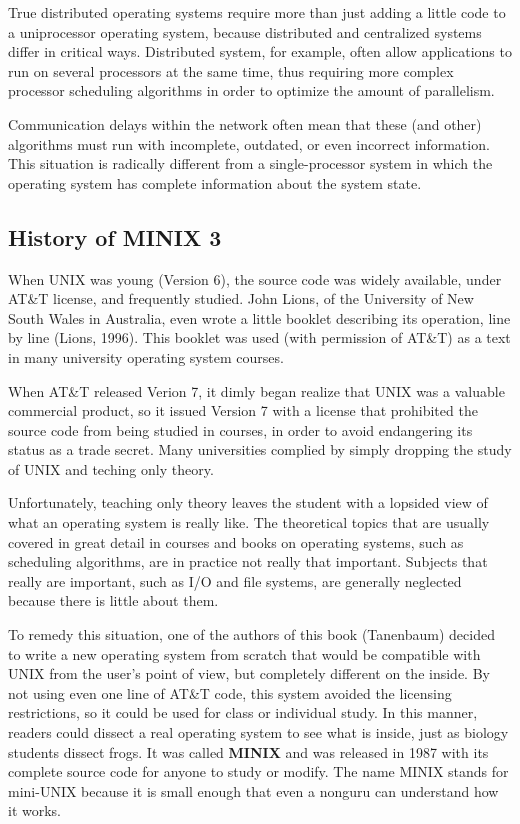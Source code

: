 \documentclass{book}
\newcommand {\kw}  [1] {\textbf{#1}}
\begin{document}
True distributed operating systems require more than just adding a little code to a uniprocessor operating system, 
because distributed and centralized systems differ in critical ways.
Distributed system, for example, often allow applications to run on several processors at the same time, 
thus requiring more complex processor scheduling algorithms in order to optimize the amount of parallelism.

Communication delays within the network often mean that these (and other) algorithms must run with incomplete, outdated, or even incorrect information.
This situation is radically different from a single-processor system in which the operating system has complete information about the system state.


\subsection{History of MINIX 3}
When UNIX was young (Version 6), the source code was widely available, under AT\&T license, and frequently studied.
John Lions, of the University of New South Wales in Australia, even wrote a little booklet describing its operation, line by line (Lions, 1996).
This booklet was used (with permission of AT\&T) as a text in many university operating system courses.

When AT\&T released Verion 7, it dimly began realize that UNIX was a valuable commercial product, 
so it issued Version 7 with a license that prohibited the source code from being studied in courses, 
in order to avoid endangering its status as a trade secret. 
Many universities complied by simply dropping the study of UNIX and teching only theory.

Unfortunately, teaching only theory leaves the student with a lopsided view of what an operating system is really like.
The theoretical topics that are usually covered in great detail in courses and books on operating systems, 
such as scheduling algorithms, are in practice not really that important. 
Subjects that really are important, such as I/O and file systems, are generally neglected because there is little about them.

To remedy this situation, one of the authors of this book (Tanenbaum) decided to write a new operating system from scratch 
that would be compatible with UNIX from the user's point of view,  but completely different on the inside.
By not using even one line of AT\&T code, this system avoided the licensing restrictions, so it could be used for class or individual study.
In this manner, readers could dissect a real operating system to see what is inside, just as biology students dissect frogs.
It was called \kw{MINIX} and was released in 1987 with its complete source code for anyone to study or modify.
The name MINIX stands for mini-UNIX because it is small enough that even a nonguru can understand how it works.
\end{document}

